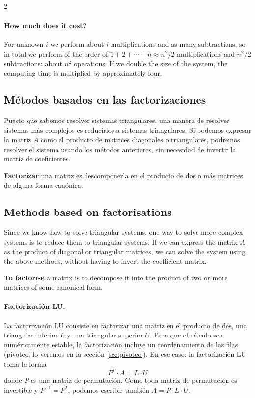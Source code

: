 \begin{paracol}{2}
\switchcolumn
\paragraph{How much does it cost?} For unknown $i$ we perform about $i$ multiplications and as many subtractions, so in total we perform of the order of $1+2+\cdots+n\approx n^2/2$ multiplications and $n^2/2$ subtractions: about $n^2$ operations. If we double the size of the system, the computing time is multiplied by approximately four.

\switchcolumn
\subsection{Métodos basados en las factorizaciones}
Puesto que sabemos resolver sistemas triangulares, una manera de resolver sistemas más complejos es reducirlos a sistemas triangulares. Si podemos expresar la matriz $A$ como el producto de matrices diagonales o triangulares, podremos resolver el sistema usando los métodos anteriores, sin necesidad de invertir la matriz de coeficientes.

\textbf{Factorizar} una matriz es descomponerla en el producto de dos o más matrices de alguna forma canónica.

\switchcolumn
\subsection{Methods based on factorisations}
Since we know how to solve triangular systems, one way to solve more complex systems is to reduce them to triangular systems. If we can express the matrix $A$ as the product of diagonal or triangular matrices, we can solve the system using the above methods, without having to invert the coefficient matrix.

\textbf{To factorise} a matrix is to decompose it into the product of two or more matrices of some canonical form.

\switchcolumn
\paragraph{Factorización LU.} La factorización LU consiste en factorizar una matriz en el producto de dos, una triangular inferior $L$ y una triangular superior $U$. Para que el cálculo sea numéricamente estable, la factorización incluye un reordenamiento de las filas (pivoteo; lo veremos en la sección \ref{sec:pivoteo}). En ese caso, la factorización LU toma la forma
\begin{equation*}
P^T\cdot A = L\cdot U
\end{equation*}
donde $P$ es una matriz de permutación. Como toda matriz de permutación es invertible y $P^{-1}=P^T$, podemos escribir también $A=P \cdot L \cdot U$.


\end{paracol}
